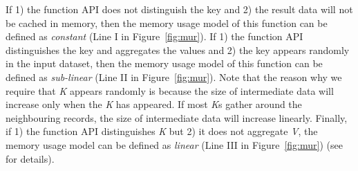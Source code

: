 If 1) the function API does not distinguish the key and 2)
the result data will not be cached in memory, then the memory
usage model of this function can be defined as \textit{constant} (Line
I in Figure~\ref{fig:mur}). If 1) the function API distinguishes the key and aggregates the values and 2) the key appears randomly in the
input dataset, then the memory usage model of this function can
be defined as \textit{sub-linear} (Line II in Figure~\ref{fig:mur}). Note that the
reason why we require that \textit{K} appears randomly is because
the size of intermediate data will increase only when the \textit{K}
has appeared. If most \textit{K}s gather around the neighbouring
records, the size of intermediate data will increase linearly.
Finally, if 1) the function API distinguishes \textit{K} but 2) it does not
aggregate \textit{V}, the memory usage model can be defined as
\textit{linear} (Line III in Figure~\ref{fig:mur}) (see~\cite{full} for details).

